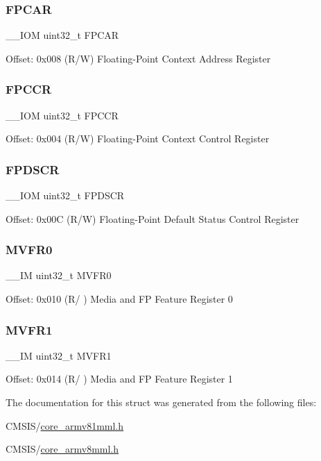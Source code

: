 \subsubsection{\texorpdfstring{FPCAR}{FPCAR}}
{\footnotesize\ttfamily \+\_\+\+\_\+\+I\+OM uint32\+\_\+t F\+P\+C\+AR}

Offset\+: 0x008 (R/W) Floating-\/\+Point Context Address Register \mbox{\label{struct_f_p_u___type_a242040bad11980d6250848a44cc967e3}} 
\subsubsection{\texorpdfstring{FPCCR}{FPCCR}}
{\footnotesize\ttfamily \+\_\+\+\_\+\+I\+OM uint32\+\_\+t F\+P\+C\+CR}

Offset\+: 0x004 (R/W) Floating-\/\+Point Context Control Register \mbox{\label{struct_f_p_u___type_a05a8c9a999e6ca4ff19f30c93ec50217}} 
\subsubsection{\texorpdfstring{FPDSCR}{FPDSCR}}
{\footnotesize\ttfamily \+\_\+\+\_\+\+I\+OM uint32\+\_\+t F\+P\+D\+S\+CR}

Offset\+: 0x00C (R/W) Floating-\/\+Point Default Status Control Register \mbox{\label{struct_f_p_u___type_a9b0103b438c8922eaea5624f71afbbc8}} 
\subsubsection{\texorpdfstring{MVFR0}{MVFR0}}
{\footnotesize\ttfamily \+\_\+\+\_\+\+IM uint32\+\_\+t M\+V\+F\+R0}

Offset\+: 0x010 (R/ ) Media and FP Feature Register 0 \mbox{\label{struct_f_p_u___type_a0a610dc4212de3ce1ad62e9afa76c728}} 
\subsubsection{\texorpdfstring{MVFR1}{MVFR1}}
{\footnotesize\ttfamily \+\_\+\+\_\+\+IM uint32\+\_\+t M\+V\+F\+R1}

Offset\+: 0x014 (R/ ) Media and FP Feature Register 1 

The documentation for this struct was generated from the following files\+:\begin{DoxyCompactItemize}
\item 
C\+M\+S\+I\+S/\mbox{\hyperlink{core__armv81mml_8h}{core\+\_\+armv81mml.\+h}}\item 
C\+M\+S\+I\+S/\mbox{\hyperlink{core__armv8mml_8h}{core\+\_\+armv8mml.\+h}}\end{DoxyCompactItemize}
